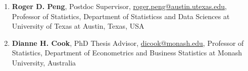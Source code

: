 \documentclass[10pt,a4paper]{article} %
\begin{document}
\begin{enumerate}[itemsep=0.1em]

    \item \textbf{Roger D. Peng}, Postdoc Supervisor, \href{mailto:roger.peng@austin.utexas.edu}{roger.peng@austin.utexas.edu}, Professor of Statistics, Department of Statisticss and Data Sciences at University of Texas at Austin, Texas, USA
    \item \textbf{Dianne H. Cook}, PhD Thesis Advisor, \href{mailto:dicook@monash.edu}{dicook@monash.edu}, Professor of Statistics, Department of Econometrics and Business Statistics at Monash University, Australia
    


\end{enumerate}
\end{document}
